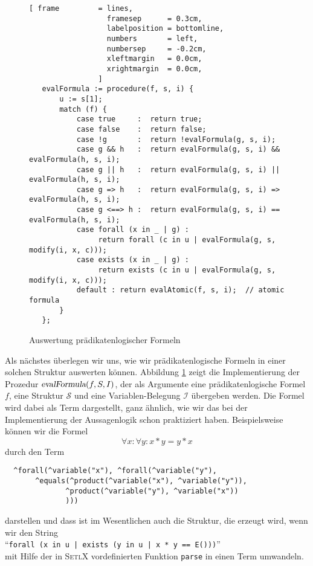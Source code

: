 \begin{figure}[!ht]
\centering
\begin{Verbatim}[ frame         = lines, 
                  framesep      = 0.3cm, 
                  labelposition = bottomline,
                  numbers       = left,
                  numbersep     = -0.2cm,
                  xleftmargin   = 0.0cm,
                  xrightmargin  = 0.0cm,
                ]
   evalFormula := procedure(f, s, i) {
       u := s[1];
       match (f) {
           case true     :  return true;
           case false    :  return false;
           case !g       :  return !evalFormula(g, s, i);
           case g && h   :  return evalFormula(g, s, i) && evalFormula(h, s, i);
           case g || h   :  return evalFormula(g, s, i) || evalFormula(h, s, i);
           case g => h   :  return evalFormula(g, s, i) => evalFormula(h, s, i);
           case g <==> h :  return evalFormula(g, s, i) == evalFormula(h, s, i);
           case forall (x in _ | g) : 
                return forall (c in u | evalFormula(g, s, modify(i, x, c)));
           case exists (x in _ | g) : 
                return exists (c in u | evalFormula(g, s, modify(i, x, c)));
           default : return evalAtomic(f, s, i);  // atomic formula
       }
   };
\end{Verbatim}
\vspace*{-0.3cm}
\caption{Auswertung pr\"{a}dikatenlogischer Formeln}
\label{fig:pl-evaluate.stlx}
\end{figure}

Als n\"{a}chstes \"{u}berlegen wir uns, wie wir pr\"{a}dikatenlogische Formeln in einer solchen Struktur
auswerten k\"{o}nnen.  Abbildung \ref{fig:pl-evaluate.stlx} zeigt die Implementierung der Prozedur
$\textsl{evalFormula}(f, S, I)$, der als Argumente eine pr\"{a}dikatenlogische Formel $f$, eine Struktur
$\mathcal{S}$ und eine Variablen-Belegung $\mathcal{I}$ \"{u}bergeben werden.  Die Formel wird
dabei als Term dargestellt,  
ganz \"{a}hnlich, wie wir das bei der Implementierung der Aussagenlogik schon praktiziert haben.
Beispielsweise k\"{o}nnen wir die Formel
\[ \forall x: \forall y: x * y = y * x \]
durch den Term
\begin{verbatim}
  ^forall(^variable("x"), ^forall(^variable("y"), 
       ^equals(^product(^variable("x"), ^variable("y")), 
              ^product(^variable("y"), ^variable("x"))
              )))
\end{verbatim}
darstellen und dass ist im Wesentlichen auch die Struktur, die erzeugt wird, wenn wir den
String
\\[0.2cm]
\hspace*{1.3cm}
``\texttt{forall (x in u | exists (y in u | x * y == E()))}''
\\[0.2cm]
mit Hilfe der in \textsc{SetlX} vordefinierten Funktion \texttt{parse} in einen Term umwandeln. 

